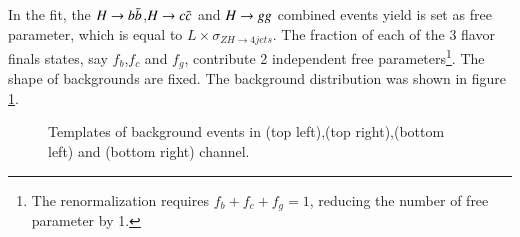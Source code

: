 In the fit, the $H\rightarrow b\bar{b}$,$H\rightarrow c\bar{c}$ and $H\rightarrow gg$ combined events yield is set as free parameter, which is equal to $L\times \sigma_{ZH\to 4jets}$. The fraction of each of the 3 flavor finals states, say $f_b$,$f_c$ and $f_g$, contribute 2 independent free parameters\footnote{The renormalization requires $f_b+f_c+f_g = 1$, reducing the number of free parameter by 1.}. The shape of backgrounds are fixed. The background distribution was shown in figure \ref{fig:bkg_template}.

\begin{figure}[!htpb]
\label{fig:bkg_template}
\centering
{}
\caption{Templates of background events in \eeh(top left),\mmh(top right),\nnh(bottom left) and \qqh(bottom right) channel.}
\end{figure}






